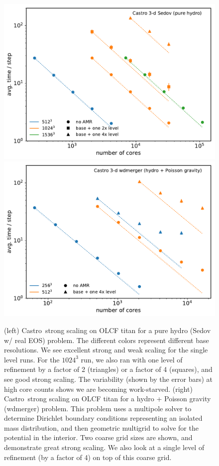\documentclass[a4paper]{jpconf}
\newcommand{\castro}{{\sffamily Castro}}
\begin{document}
\begin{figure}[t]
\centering
\includegraphics[width=0.48\linewidth]{sedov_scaling}
\includegraphics[width=0.48\linewidth]{wdmerger_scaling}
\caption{\label{fig:castro-scaling} (left) \castro\ strong scaling on
  OLCF titan for a pure hydro (Sedov w/ real EOS) problem.  The
  different colors represent different base resolutions.  We see
  excellent strong and weak scaling for the single level runs.  For
  the $1024^3$ run, we also ran with one level of refinement by a
  factor of 2 (triangles) or a factor of 4 (squares), and see good
  strong scaling.  The variability (shown by the error bars) at high
  core counts shows we are becoming work-starved. (right)
  \castro\ strong scaling on OLCF titan for a hydro + Poisson gravity
  (wdmerger) problem.  This problem uses a multipole solver to
  determine Dirichlet boundary conditions representing an isolated
  mass distribution, and then geometric multigrid to solve for the
  potential in the interior.  Two coarse grid sizes are shown, and
  demonstrate great strong scaling.  We also look at a single level of
  refinement (by a factor of 4) on top of this coarse grid.}
\end{figure}
\end{document}
